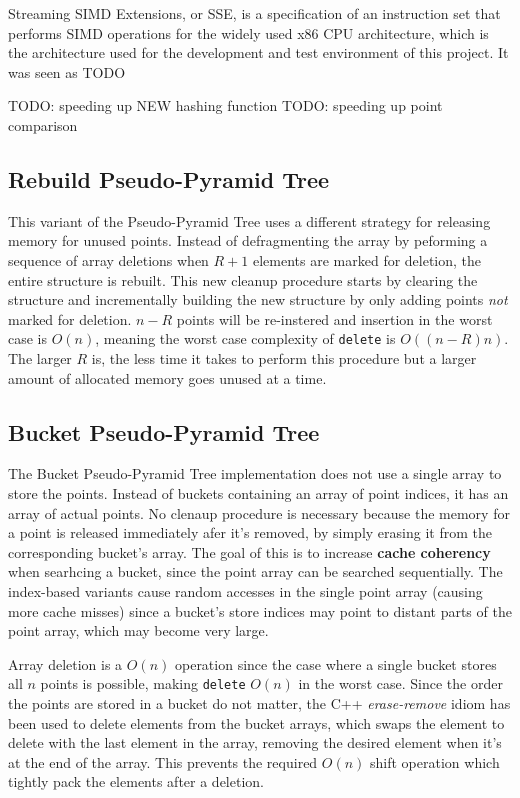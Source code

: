 Streaming SIMD Extensions, or SSE, is a specification of an instruction set that performs SIMD operations for the widely used x86 CPU architecture\cite{sse}, which is the architecture used for the development and test environment of this project. It was seen as TODO

TODO: speeding up NEW hashing function
TODO: speeding up point comparison

\subsection{Rebuild Pseudo-Pyramid Tree}

This variant of the Pseudo-Pyramid Tree uses a different strategy for releasing memory for unused points. Instead of defragmenting the array by peforming a sequence of array deletions when $R + 1$ elements are marked for deletion, the entire structure is rebuilt. This new cleanup procedure starts by clearing the structure and incrementally building the new structure by only adding points \textit{not} marked for deletion. $n - R$ points will be re-instered and insertion in the worst case is $O(n)$, meaning the worst case complexity of \texttt{delete} is $O((n - R)n)$. The larger $R$ is, the less time it takes to perform this procedure but a larger amount of allocated memory goes unused at a time.

\subsection{Bucket Pseudo-Pyramid Tree}

The Bucket Pseudo-Pyramid Tree implementation does not use a single array to store the points. Instead of buckets containing an array of point indices, it has an array of actual points. No clenaup procedure is necessary because the memory for a point is released immediately afer it's removed, by simply erasing it from the corresponding bucket's array. The goal of this is to increase \textbf{cache coherency} when searhcing a bucket, since the point array can be searched sequentially. The index-based variants cause random accesses in the single point array (causing more cache misses) since a bucket's store indices may point to distant parts of the point array, which may become very large.


Array deletion is a $O(n)$ operation since the case where a single bucket stores all $n$ points is possible, making \texttt{delete} $O(n)$ in the worst case. Since the order the points are stored in a bucket do not matter, the C++ \textit{erase-remove} idiom has been used to delete elements from the bucket arrays, which swaps the element to delete with the last element in the array, removing the desired element when it's at the end of the array. This prevents the required $O(n)$ shift operation which tightly pack the elements after a deletion.

